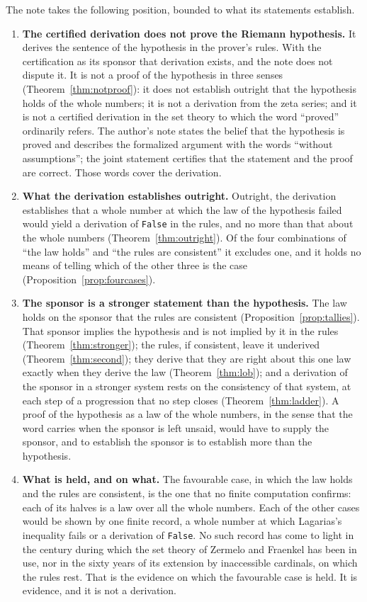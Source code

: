 \documentclass[11pt]{article}
\theoremstyle{definition}
\theoremstyle{remark}
\DeclareRobustCommand{\lean}[1]{{\renewcommand{\_}{\textunderscore\allowbreak}\texttt{#1}}}
\newcommand{\False}{\lean{False}}
\begin{document}
The note takes the following position, bounded to what its statements establish.

\begin{enumerate}[leftmargin=2em,itemsep=4pt]
\item \textbf{The certified derivation does not prove the Riemann hypothesis.} It derives the sentence of the hypothesis in the prover's rules. With the certification as its sponsor that derivation exists, and the note does not dispute it. It is not a proof of the hypothesis in three senses (Theorem~\ref{thm:notproof}): it does not establish outright that the hypothesis holds of the whole numbers; it is not a derivation from the zeta series; and it is not a certified derivation in the set theory to which the word ``proved'' ordinarily refers. The author's note states the belief that the hypothesis is proved and describes the formalized argument with the words ``without assumptions''; the joint statement certifies that the statement and the proof are correct. Those words cover the derivation.

\item \textbf{What the derivation establishes outright.} Outright, the derivation establishes that a whole number at which the law of the hypothesis failed would yield a derivation of \False{} in the rules, and no more than that about the whole numbers (Theorem~\ref{thm:outright}). Of the four combinations of ``the law holds'' and ``the rules are consistent'' it excludes one, and it holds no means of telling which of the other three is the case (Proposition~\ref{prop:fourcases}).

\item \textbf{The sponsor is a stronger statement than the hypothesis.} The law holds on the sponsor that the rules are consistent (Proposition~\ref{prop:tallies}). That sponsor implies the hypothesis and is not implied by it in the rules (Theorem~\ref{thm:stronger}); the rules, if consistent, leave it underived (Theorem~\ref{thm:second}); they derive that they are right about this one law exactly when they derive the law (Theorem~\ref{thm:lob}); and a derivation of the sponsor in a stronger system rests on the consistency of that system, at each step of a progression that no step closes (Theorem~\ref{thm:ladder}). A proof of the hypothesis as a law of the whole numbers, in the sense that the word carries when the sponsor is left unsaid, would have to supply the sponsor, and to establish the sponsor is to establish more than the hypothesis.

\item \textbf{What is held, and on what.} The favourable case, in which the law holds and the rules are consistent, is the one that no finite computation confirms: each of its halves is a law over all the whole numbers. Each of the other cases would be shown by one finite record, a whole number at which Lagarias's inequality fails or a derivation of \False. No such record has come to light in the century during which the set theory of Zermelo and Fraenkel has been in use, nor in the sixty years of its extension by inaccessible cardinals, on which the rules rest. That is the evidence on which the favourable case is held. It is evidence, and it is not a derivation.


\end{enumerate}
\end{document}
